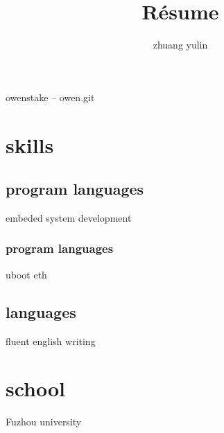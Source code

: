 \documentclass{article}
\title{R\'esume}
\author{zhuang yulin}
\date{}
\renewcommand{\maketitle}{
\begin{center}
{\huge\bfseries
    \theauthor}   %

\vspace{.25em}  %

owenstake -- owen.git

\end{center}
}
\begin{document}
\maketitle

\section{skills}
\subsection{program languages}
embeded system development
\subsubsection{program languages}
uboot eth

\subsection{languages}
fluent english writing

\section{school}
Fuzhou university
\end{document}
